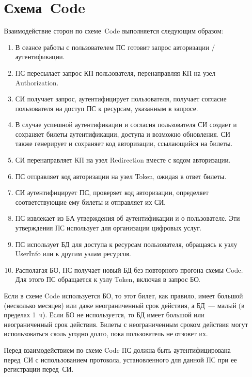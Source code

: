 \section{Схема~Code}\label{OIDC.Code}

Взаимодействие сторон по схеме~Code выполняется следующим образом:

\begin{enumerate}
\item 
В сеансе работы с пользователем ПС готовит запрос авторизации / аутентификации.

\item 
ПС пересылает запрос КП пользователя, перенаправляя КП на узел Authorization.

\item 
СИ получает запрос, аутентифицирует пользователя, получает согласие пользователя
на доступ ПС к ресурсам, указанным в запросе.

\item 
В случае успешной аутентификации и согласия пользователя СИ создает и сохраняет
билеты аутентификации, доступа и возможно обновления. СИ также генерирует и
сохраняет код авторизации, ссылающийся на билеты.

\item 
СИ перенаправляет КП на узел Redirection вместе с кодом авторизации.
 
\item 
ПС отправляет код авторизации на узел Token, ожидая в ответ билеты. 

\item 
СИ аутентифицирует ПС, проверяет код авторизации, определяет соответствующие ему
билеты и отправляет их СИ.

\item 
ПС извлекает из БА утверждения об аутентификации и о пользователе. Эти
утверждения ПС использует для организации цифровых услуг.

\item 
ПС использует БД для доступа к ресурсам пользователя,
обращаясь к узлу UserInfo или к другим узлам ресурсов. 

\item 
Располагая БО, ПС получает новый БД без повторного прогона схемы 
Code. Для этого ПС обращается к узлу Token, включая в запрос БО.
\end{enumerate}

Если в схеме Code используется БО, то этот билет, как правило, 
имеет большой (несколько месяцев) или даже неограниченный срок действия,
а БД~--- малый (в пределах 1~ч). 
%
Если БО не используется, то БД имеет большой или неограниченный срок 
действия. 
%
Билеты с неограниченным сроком действия могут использоваться сколь 
угодно долго, пока пользователь не отзовет их.

Перед взаимодействием по схеме Code ПС должна быть аутентифицирована перед~СИ с 
использованием протокола, установленного для данной ПС при ее регистрации 
перед~СИ.
